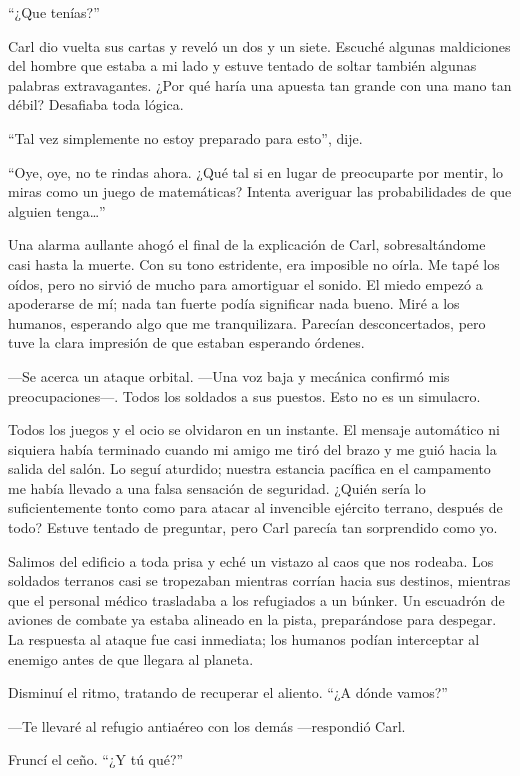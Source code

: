 ``¿Que tenías?''

Carl dio vuelta sus cartas y reveló un dos y un siete. Escuché algunas maldiciones del hombre que estaba a mi lado y estuve tentado de soltar también algunas palabras extravagantes. ¿Por qué haría una apuesta tan grande con una mano tan débil? Desafiaba toda lógica.

``Tal vez simplemente no estoy preparado para esto'', dije.

``Oye, oye, no te rindas ahora. ¿Qué tal si en lugar de preocuparte por mentir, lo miras como un juego de matemáticas? Intenta averiguar las probabilidades de que alguien tenga…''

Una alarma aullante ahogó el final de la explicación de Carl, sobresaltándome casi hasta la muerte. Con su tono estridente, era imposible no oírla. Me tapé los oídos, pero no sirvió de mucho para amortiguar el sonido. El miedo empezó a apoderarse de mí; nada tan fuerte podía significar nada bueno. Miré a los humanos, esperando algo que me tranquilizara. Parecían desconcertados, pero tuve la clara impresión de que estaban esperando órdenes.

—Se acerca un ataque orbital. —Una voz baja y mecánica confirmó mis preocupaciones—. Todos los soldados a sus puestos. Esto no es un simulacro.

Todos los juegos y el ocio se olvidaron en un instante. El mensaje automático ni siquiera había terminado cuando mi amigo me tiró del brazo y me guió hacia la salida del salón. Lo seguí aturdido; nuestra estancia pacífica en el campamento me había llevado a una falsa sensación de seguridad. ¿Quién sería lo suficientemente tonto como para atacar al invencible ejército terrano, después de todo? Estuve tentado de preguntar, pero Carl parecía tan sorprendido como yo.

Salimos del edificio a toda prisa y eché un vistazo al caos que nos rodeaba. Los soldados terranos casi se tropezaban mientras corrían hacia sus destinos, mientras que el personal médico trasladaba a los refugiados a un búnker. Un escuadrón de aviones de combate ya estaba alineado en la pista, preparándose para despegar. La respuesta al ataque fue casi inmediata; los humanos podían interceptar al enemigo antes de que llegara al planeta.

Disminuí el ritmo, tratando de recuperar el aliento. ``¿A dónde vamos?''

—Te llevaré al refugio antiaéreo con los demás —respondió Carl.

Fruncí el ceño. ``¿Y tú qué?''

